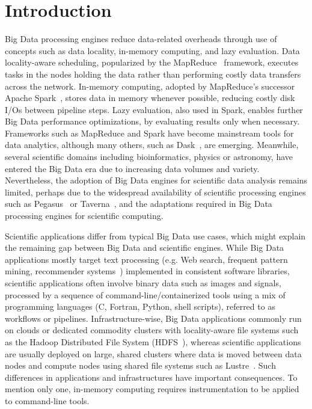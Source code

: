\documentclass{IEEEtran}
\begin{document}
\section{Introduction} %

Big Data processing engines reduce data-related overheads through 
use of concepts such as data locality, in-memory computing, and lazy evaluation.
Data locality-aware scheduling, popularized by the MapReduce~\cite{dean2008mapreduce} 
framework, executes tasks in the nodes holding the data rather than 
performing costly data transfers across the network. In-memory 
computing, adopted by MapReduce's successor Apache 
Spark~\cite{zaharia2016apache}, stores data in memory whenever 
possible, reducing costly disk I/Os between pipeline steps. 
Lazy evaluation, also used in Spark, enables further Big Data performance 
optimizations, by evaluating results only when necessary. Frameworks 
such as
MapReduce and Spark have become mainstream tools for data analytics, 
although many others, such as 
Dask~\cite{rocklin2015dask}, are emerging. 
Meanwhile, several scientific 
domains including bioinformatics, physics or astronomy, have entered 
the Big Data era due to increasing data volumes and variety. 
Nevertheless, the adoption of Big Data engines for scientific data analysis 
remains limited, perhaps due to the widespread availability of 
scientific processing engines such as Pegasus~\cite{deelman2005pegasus} or
Taverna~\cite{oinn2004taverna}, and the adaptations required in Big 
Data processing engines for scientific computing. 

Scientific applications differ from typical Big Data use 
cases, which might explain the remaining gap between Big Data and 
scientific engines. While Big Data applications mostly target text 
processing (e.g. Web search, frequent pattern mining, recommender 
systems~\cite{leskovec2014mining}) implemented in consistent software 
libraries, scientific applications often involve 
binary data such as images and signals, processed by a sequence of 
command-line/containerized tools
using a mix of programming languages (C, Fortran, Python, shell 
scripts), referred to as workflows or pipelines. Infrastructure-wise, 
Big Data applications commonly run on 
clouds or dedicated commodity clusters with locality-aware file systems 
such as the Hadoop Distributed File System 
(HDFS~\cite{shvachko2010hadoop}), whereas scientific applications are 
usually deployed on large, shared clusters where data is moved between
data nodes and compute nodes using shared file systems such 
as Lustre~\cite{schwan2003lustre}. Such differences in applications and 
infrastructures have important consequences. To 
mention only one, in-memory computing requires instrumentation to be 
applied to command-line tools. 
\end{document}
